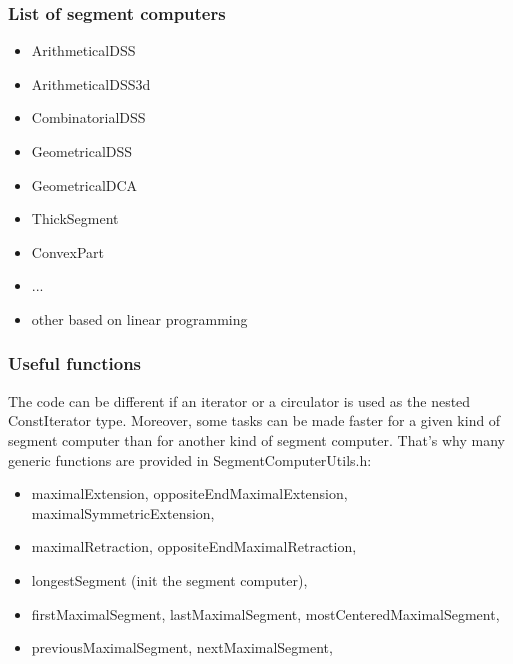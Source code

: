 \begin{frame}
  \frametitle{List of segment computers}
 


\begin{itemize}
  \item \alert{ArithmeticalDSS}
  \item ArithmeticalDSS3d
  \item CombinatorialDSS
  \item GeometricalDSS
  \item GeometricalDCA
  \item ThickSegment
  \item ConvexPart
  \item ...
  \item other based on linear programming
\end{itemize}



\end{frame}

\begin{frame}
  \frametitle{Useful functions}
 
The code can be different if an iterator or a circulator is used as the nested ConstIterator type. Moreover, some tasks can be made faster for a given kind of segment computer than for another kind of segment computer. That's why many generic functions are provided in SegmentComputerUtils.h:

\begin{itemize}
 \item maximalExtension, oppositeEndMaximalExtension, maximalSymmetricExtension,
 \item maximalRetraction, oppositeEndMaximalRetraction,
 \item longestSegment (init the segment computer),
 \item firstMaximalSegment, lastMaximalSegment, mostCenteredMaximalSegment,
 \item previousMaximalSegment, nextMaximalSegment,
\end{itemize}



\end{frame}


